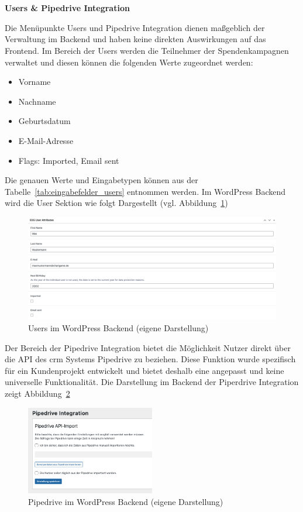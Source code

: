 \\\\
\textbf{Users \& Pipedrive Integration}

Die Menüpunkte Users und Pipedrive Integration dienen maßgeblich der Verwaltung im Backend und haben keine direkten Auswirkungen auf das Frontend.
Im Bereich der Users werden die Teilnehmer der Spendenkampagnen verwaltet und diesen können die folgenden Werte zugeordnet werden:
\begin{itemize}
    \item Vorname
    \item Nachname
    \item Geburtsdatum
    \item E-Mail-Adresse
    \item Flags: Imported, Email sent
\end{itemize}
Die genauen Werte und Eingabetypen können aus der Tabelle~\ref{tab:eingabefelder_users} entnommen werden.
Im WordPress Backend wird die User Sektion wie folgt Dargestellt (vgl. Abbildung~\ref{fig:users-backend-legacy})

\begin{figure}[H]
    \centering
    \includegraphics[width=1\textwidth]{images/legacy_users_backend}
    \caption{Users im WordPress Backend (eigene Darstellung)}
    \label{fig:users-backend-legacy}
\end{figure}

Der Bereich der Pipedrive Integration bietet die Möglichkeit Nutzer direkt über die API des \gls{crm} Systems Pipedrive zu beziehen.
Diese Funktion wurde spezifisch für ein Kundenprojekt entwickelt und bietet deshalb eine angepasst und keine universelle Funktionalität.
Die Darstellung im Backend der Piperdrive Integration zeigt Abbildung~\ref{fig:pipedrive-backend-legacy}

\begin{figure}[H]
    \centering
    \includegraphics[width=0.5\textwidth]{images/legacy_pipedrive_backend}
    \caption{Pipedrive im WordPress Backend (eigene Darstellung)}
    \label{fig:pipedrive-backend-legacy}
\end{figure}

